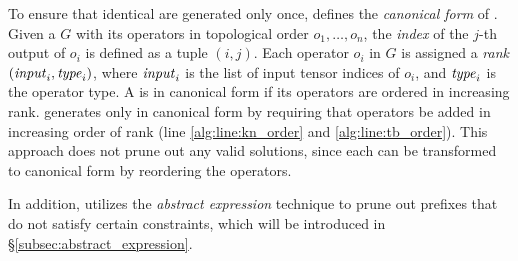 To ensure that identical \graphs are generated only once, \sys defines the \textit{canonical form} of \graphs. 
Given a \graph $G$ with its operators in topological order $o_1, \ldots, o_n$, the \textit{index} of the $j$-th output of $o_i$ is defined as a tuple $(i, j)$. Each operator $o_i$ in $G$ is assigned a \textit{rank} $(\mathit{input}_i, \mathit{type}_i)$, where $\mathit{input}_i$ is the list of input tensor indices of $o_i$, and $\mathit{type}_i$ is the operator type. 
A \graph is in canonical form if its operators are ordered in increasing rank. 
\sys generates only \graphs in canonical form by requiring that operators be added in increasing order of rank (line \ref{alg:line:kn_order} and \ref{alg:line:tb_order}). This approach does not prune out any valid solutions, since each \graph can be transformed to canonical form by reordering the operators.

In addition, \sys utilizes the \textit{abstract expression} technique to prune out prefixes that do not satisfy certain constraints, which will be introduced in \S\ref{subsec:abstract_expression}.




